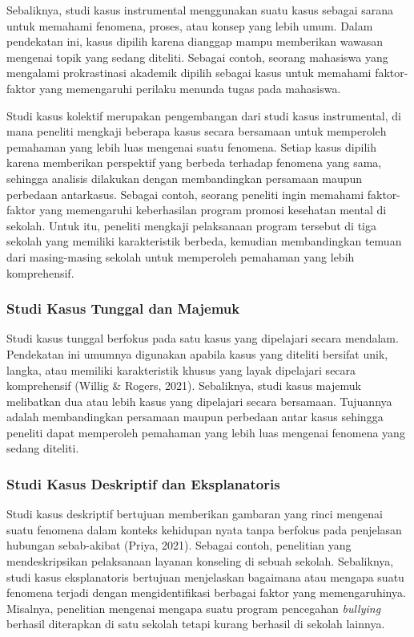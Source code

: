 \documentclass[
  indonesian,
  letterpaper,
  DIV=11,
  numbers=noendperiod]{scrreprt}
\begin{document}
Sebaliknya, studi kasus instrumental menggunakan suatu kasus sebagai
sarana untuk memahami fenomena, proses, atau konsep yang lebih umum.
Dalam pendekatan ini, kasus dipilih karena dianggap mampu memberikan
wawasan mengenai topik yang sedang diteliti. Sebagai contoh, seorang
mahasiswa yang mengalami prokrastinasi akademik dipilih sebagai kasus
untuk memahami faktor-faktor yang memengaruhi perilaku menunda tugas
pada mahasiswa.

Studi kasus kolektif merupakan pengembangan dari studi kasus
instrumental, di mana peneliti mengkaji beberapa kasus secara bersamaan
untuk memperoleh pemahaman yang lebih luas mengenai suatu fenomena.
Setiap kasus dipilih karena memberikan perspektif yang berbeda terhadap
fenomena yang sama, sehingga analisis dilakukan dengan membandingkan
persamaan maupun perbedaan antarkasus. Sebagai contoh, seorang peneliti
ingin memahami faktor-faktor yang memengaruhi keberhasilan program
promosi kesehatan mental di sekolah. Untuk itu, peneliti mengkaji
pelaksanaan program tersebut di tiga sekolah yang memiliki karakteristik
berbeda, kemudian membandingkan temuan dari masing-masing sekolah untuk
memperoleh pemahaman yang lebih komprehensif.

\subsubsection{Studi Kasus Tunggal dan
Majemuk}\label{studi-kasus-tunggal-dan-majemuk}

Studi kasus tunggal berfokus pada satu kasus yang dipelajari secara
mendalam. Pendekatan ini umumnya digunakan apabila kasus yang diteliti
bersifat unik, langka, atau memiliki karakteristik khusus yang layak
dipelajari secara komprehensif (Willig \& Rogers, 2021). Sebaliknya,
studi kasus majemuk melibatkan dua atau lebih kasus yang dipelajari
secara bersamaan. Tujuannya adalah membandingkan persamaan maupun
perbedaan antar kasus sehingga peneliti dapat memperoleh pemahaman yang
lebih luas mengenai fenomena yang sedang diteliti.

\subsubsection{Studi Kasus Deskriptif dan
Eksplanatoris}\label{studi-kasus-deskriptif-dan-eksplanatoris}

Studi kasus deskriptif bertujuan memberikan gambaran yang rinci mengenai
suatu fenomena dalam konteks kehidupan nyata tanpa berfokus pada
penjelasan hubungan sebab-akibat (Priya, 2021). Sebagai contoh,
penelitian yang mendeskripsikan pelaksanaan layanan konseling di sebuah
sekolah. Sebaliknya, studi kasus eksplanatoris bertujuan menjelaskan
bagaimana atau mengapa suatu fenomena terjadi dengan mengidentifikasi
berbagai faktor yang memengaruhinya. Misalnya, penelitian mengenai
mengapa suatu program pencegahan \emph{bullying} berhasil diterapkan di
satu sekolah tetapi kurang berhasil di sekolah lainnya.
\end{document}
